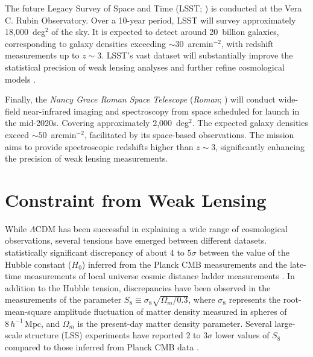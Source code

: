 The future Legacy Survey of Space and Time (LSST; \citealt{2009arXiv0912.0201L, 2019ApJ...873..111I}) is conducted at the Vera C. Rubin Observatory. Over a 10-year period, LSST will survey approximately 18,000~deg$^2$ of the sky. It is expected to detect around 20~billion galaxies, corresponding to galaxy densities exceeding $\sim 30$~arcmin$^{-2}$, with redshift measurements up to $z \sim 3$. LSST's vast dataset will substantially improve the statistical precision of weak lensing analyses and further refine cosmological models \citep{2012arXiv1211.0310L}.

Finally, the \textit{Nancy Grace Roman Space Telescope} (\emph{Roman}; \citealt{2015arXiv150303757S}) will conduct wide-field near-infrared imaging and spectroscopy from space scheduled for launch in the mid-2020s. Covering approximately 2,000~deg$^2$. The expected galaxy densities exceed $\sim 50$~arcmin$^{-2}$, facilitated by its space-based observations. The mission aims to provide spectroscopic redshifts higher than $z \sim 3$, significantly enhancing the precision of weak lensing measurements.

\section{Constraint from Weak Lensing}
While $\Lambda$CDM has been successful in explaining a wide range of cosmological observations, several tensions have emerged between different datasets. statistically significant discrepancy of about $4$ to $5\sigma$ between the value of the Hubble constant ($H_0$) inferred from the Planck CMB measurements \citep{2021CQGra..38o3001D} and the late-time measurements of local universe cosmic distance ladder measurements \citep{2022ApJ...934L...7R}. In addition to the Hubble tension, discrepancies have been observed in the measurements of the parameter $S_8 \equiv \sigma_8 \sqrt{\Omega_m/0.3}$, where $\sigma_8$ represents the root-mean-square amplitude fluctuation of matter density measured in spheres of $8\, h^{-1}\,\mathrm{Mpc}$, and $\Omega_m$ is the present-day matter density parameter. Several large-scale structure (LSS) experiments have reported $2$ to $3\sigma$ lower values of $S_8$ compared to those inferred from Planck CMB data \citep{2019PASJ...71...43H, 2021A&A...645A.104A, 2021JCAP...10..030G}.

